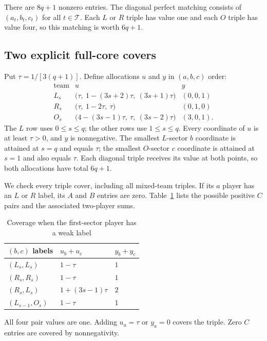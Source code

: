 \documentclass[11pt]{article}
\theoremstyle{remark}\newtheorem{remark}[theorem]{Remark}
\begin{document}
There are $8q+1$ nonzero entries. The diagonal perfect matching consists
of $(a_t,b_t,c_t)$ for all $t\in\mathcal T$. Each $L$ or $R$ triple has
value one and each $O$ triple has value four, so this matching is worth
$6q+1$.

\subsection{Two explicit full-core covers}
Put $\tau=1/[3(q+1)]$. Define allocations $u$ and $y$ in $(a,b,c)$ order:
\begin{equation}\label{eq:witnesses}
\begin{array}{c|c|c}
\text{team}&u&y\\\hline
L_s&\bigl(\tau,\ 1-(3s+2)\tau,\ (3s+1)\tau\bigr)&(0,0,1)\\
R_s&\bigl(\tau,\ 1-2\tau,\ \tau\bigr)&(0,1,0)\\
O_s&\bigl(4-(3s-1)\tau,\ \tau,\ (3s-2)\tau\bigr)&(3,0,1).
\end{array}
\end{equation}
The $L$ row uses $0\leq s\leq q$; the other rows use $1\leq s\leq q$.
Every coordinate of $u$ is at least $\tau>0$, and $y$ is nonnegative.
The smallest $L$-sector $b$ coordinate is attained at $s=q$ and equals
$\tau$; the smallest $O$-sector $c$ coordinate is attained at $s=1$
and also equals $\tau$. Each diagonal triple receives its value at
both points, so both allocations have total $6q+1$.

We check every triple cover, including all mixed-team triples. If its
$a$ player has an $L$ or $R$ label, its $A$ and $B$ entries are zero.
Table~\ref{tab:weak-cover} lists the possible positive $C$ pairs and the associated two-player sums.

\begin{table}[htbp]
\centering
\caption{Coverage when the first-sector player has a weak label}\label{tab:weak-cover}
\begin{tabular}{lll}\toprule
$(b,c)$ labels & $u_b+u_c$ & $y_b+y_c$\\\midrule
$(L_s,L_s)$ & $1-\tau$ & $1$\\
$(R_s,R_s)$ & $1-\tau$ & $1$\\
$(R_s,L_s)$ & $1+(3s-1)\tau$ & $2$\\
$(L_{s-1},O_s)$ & $1-\tau$ & $1$\\\bottomrule
\end{tabular}
\end{table}

All four pair values are one. Adding $u_a=\tau$ or $y_a=0$ covers the
triple. Zero $C$ entries are covered by nonnegativity.
\end{document}
